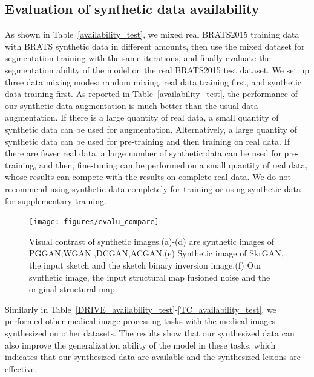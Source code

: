 \documentclass[runningheads]{llncs}
\begin{document}
	\subsection{Evaluation of synthetic data availability}
	As shown in Table~\ref{availability_test}, we mixed real BRATS2015 training data with BRATS synthetic data in different amounts, then use the mixed dataset for segmentation training with the same iterations, and finally evaluate the segmentation ability of the model on the real BRATS2015 test dataset. We set up three data mixing modes: random mixing, real data training first, and synthetic data training first. As reported in Table~\ref{availability_test}, the performance of our synthetic data augmentation is much better than the usual data augmentation. If there is a large quantity of real data, a small quantity of synthetic data can be used for augmentation. Alternatively, a large quantity of synthetic data can be used for pre-training and then training on real data. If there are fewer real data, a large number of synthetic data can be used for pre-training, and then, fine-tuning can be performed on a small quantity of real data, whose results can compete with the results on complete real data. We do not recommend using synthetic data completely for training or using synthetic data for supplementary training.
	\begin{figure}[thbp!]
		\centering
		\texttt{[image: figures/evalu\_compare]}
		\caption{Visual contrast of synthetic images.(a)-(d) are synthetic images of PGGAN\cite{100karras2017progressive,96zhang2019skrgan:},WGAN \cite{99arjovsky2017wasserstein,96zhang2019skrgan:},DCGAN\cite{97radford2015unsupervised,96zhang2019skrgan:},ACGAN\cite{98odena2016conditional,96zhang2019skrgan:}.(e) Synthetic image of SkrGAN\cite{96zhang2019skrgan:}, the input sketch and the sketch binary inversion image.(f) Our synthetic image, the input structural map fusioned noise and the original structural map.}
		\label{evalu_compare}
	\end{figure}
	Similarly in Table~\ref{DRIVE_availability_test}-\ref{TC_availability_test}, we performed other medical image processing tasks with the medical images synthesized on other datasets. The results show that our synthesized data can also improve the generalization ability of the model in these tasks, which indicates that our synthesized data are available and the synthesized lesions are effective.
\end{document}
